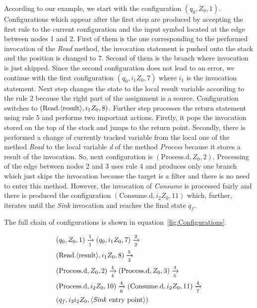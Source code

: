 According to our example, we start with the configuration $(q_0, Z_0, 1)$.
Configurations which appear after the first step are produced by accepting the first rule to the current configuration and the input symbol located at the edge between nodes 1 and 2.
First of them is the one corresponding to the performed invocation of the \textit{Read} method, the invocation statement is pushed onto the stack and the position is changed to 7.
Second of them is the branch where invocation is just skipped.
Since the second configuration does not lead to an error, we continue with the first configuration $(q_0, i_1 Z_0, 7)$ where $i_1$ is the invocation statement.
Next step changes the state to the local \textlangle{}result\textrangle{} variable according to the rule 2 because the right part of the assignment is a source. Configuration switches to $(\text{Read.\textlangle{}result\textrangle{}}, i_1 Z_0, 8)$.
Further step processes the return statement using rule 5 and performs two important actions.
Firstly, it pops the invocation stored on the top of the stack and jumps to the return point.
Secondly, there is performed a change of currently tracked variable from the local one of the method \textit{Read} to the local variable \textit{d} of the method \textit{Process} because it stores a result of the invocation.
So, next configuration is $(\text{Process.d}, Z_0, 2)$.
Processing of the edge between nodes 2 and 3 uses rule 4 and produces only one branch which just skips the invocation because the target is a filter and there is no need to enter this method.
However, the invocation of \textit{Consume} is processed fairly and there is produced the configuration $(\text{Consume.d}, i_2 Z_0, 11)$ which, further, iterates until the \textit{Sink} invocation and reaches the final state $q_f$.

The full chain of configurations is shown in equation~\ref{fig:Configurations}.

\begin{equation}
    \label{fig:Configurations}
    \begin{split}
        & (q_0, Z_0, 1) \xrightarrow[1]{1} (q_0, i_1 Z_0, 7) \xrightarrow[2]{2} \\
        & (\text{Read.\textlangle{}result\textrangle{}}, i_1 Z_0, 8) \xrightarrow[3]{5} \\
        & (\text{Process.d}, Z_0, 2) \xrightarrow[4]{4} (\text{Process.d}, Z_0, 3) \xrightarrow[5]{4} \\
        & (\text{Process.d}, i_2 Z_0, 10) \xrightarrow[6]{4} (\text{Consume.d}, i_2 Z_0, 11) \xrightarrow[7]{4} \\
        & (q_f, i_3 i_2 Z_0, \text{\textlangle{}\textit{Sink} entry point\textrangle{}})
    \end{split}
\end{equation}

